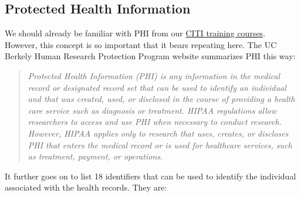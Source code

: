 \documentclass[
  letterpaper,
  DIV=11,
  numbers=noendperiod]{scrreprt}
\begin{document}
\subsection{Protected Health
Information}\label{protected-health-information}

We should already be familiar with PHI from our
\href{https://www.uth.edu/cphs/for-researchers/training.htm}{CITI
training courses}. However, this concept is so important that it bears
repeating here. The UC Berkely Human Research Protection Program website
summarizes PHI this way:

\begin{quote}
\emph{Protected Health Information (PHI) is any information in the
medical record or designated record set that can be used to identify an
individual and that was created, used, or disclosed in the course of
providing a health care service such as diagnosis or treatment. HIPAA
regulations allow researchers to access and use PHI when necessary to
conduct research. However, HIPAA applies only to research that uses,
creates, or discloses PHI that enters the medical record or is used for
healthcare services, such as treatment, payment, or operations}.
\end{quote}

It further goes on to list 18 identifiers that can be used to identify
the individual associated with the health records. They are:
\end{document}
